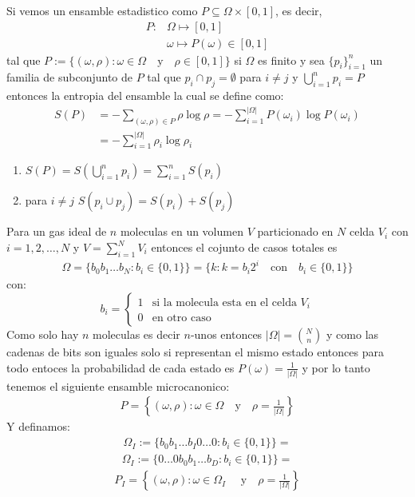 \begin{answer}
    Si vemos un ensamble estadistico como $P\subseteq \Omega \times [0,1]$, es decir,
    \begin{align*}
        P: &\Omega \mapsto [0,1]\\
        &\omega \mapsto P(\omega) \in [0,1]
    \end{align*}
    tal que $P := \{(\omega,\rho): \omega \in \Omega \quad \text{y} \quad \rho \in [0,1]\}$ si $\Omega$ es finito y sea $\{p_i\}_{i=1}^n$ un familia de subconjunto de $P$ tal que $p_i \cap p_ j = \emptyset$ para $i\neq j$ y $\bigcup_{i=1}^n p_i = P$ entonces la entropia 
    del ensamble la cual se define como:
    \begin{align*}
        S(P) &= -\sum_{(\omega,\rho) \in P} \rho \log \rho = -\sum_{i = 1}^{|\Omega|} P(\omega_i) \log P(\omega_i)\\
        &= -\sum_{i = 1}^{|\Omega|} \rho_i \log \rho_i
    \end{align*} 
    \begin{enumerate}
        \item $S(P) = S\left(\bigcup_{i=1}^n p_i\right) = \sum_{i=1}^n S(p_i)$
        \item para $i\neq j$ $S(p_i \cup p_j) = S(p_i) + S(p_j)$
    \end{enumerate}
    Para un gas ideal de $n$ moleculas en un volumen $V$ particionado en $N$ celda $V_i$ con $i = 1,2,\dots,N$ y $V = \sum_{i=1}^N V_i$ entonces el cojunto de casos totales es 
    \begin{align*}
        \Omega = \{b_0b_1\dots b_N: b_i \in \{0,1\}\} = \{k: k = b_i 2^i \quad \text{con} \quad b_i \in \{0,1\}\}
    \end{align*}
    con:
    $$
     b_i = \begin{cases}
        1 & \text{si la molecula esta en el celda } V_i\\
        0 & \text{en otro caso}
    \end{cases}
    $$ 
    Como solo hay $n$ moleculas es decir $n$-unos entonces $|\Omega| = \binom{N}{n}$ y como las cadenas de bits son iguales solo si representan el mismo estado entonces para todo entoces la probabilidad de cada estado es $P(\omega) = \frac{1}{|\Omega|}$ y por lo tanto 
    tenemos el siguiente ensamble microcanonico:
    \begin{align*} 
    P = \left\{(\omega,\rho): \omega \in \Omega \quad \text{y} \quad \rho = \frac{1}{|\Omega|}\right\}
    \end{align*}
    Y definamos:
    \begin{align*}
        \Omega_I := \{b_0b_1\dots b_I0\dots 0: b_i \in \{0,1\}\} =  
    \end{align*}
    \begin{align*}
        \Omega_I := \{0\dots 0b_0b_1\dots b_D: b_i \in \{0,1\}\} =  
    \end{align*}
    \begin{align*}
        P_I = \left\{(\omega,\rho): \omega \in \Omega_I \quad  \text{ y} \quad \rho = \frac{1}{|\Omega|}\right\}
    \end{align*}

\end{answer}